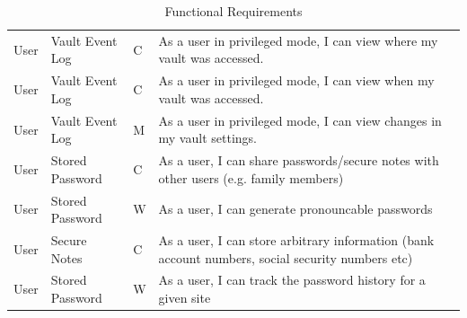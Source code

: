 \documentclass{article}
\begin{document}
\begin{table}[H]
{\begin{tabular}{>{\centering}m{1cm} >{\centering}m{4cm} >{\centering}m{2cm} >{\centering\arraybackslash}m{8cm} }
    User & Vault Event Log & C & As a user in privileged mode, I can view where my vault was accessed. \\
    User & Vault Event Log & C & As a user in privileged mode, I can view when my vault was accessed. \\
    User & Vault Event Log & M & As a user in privileged mode, I can view changes in my vault settings. \\
    User & Stored Password & C & As a user, I can share passwords/secure notes with other users (e.g. family members) \\
    User & Stored Password & W & As a user, I can generate pronouncable passwords \\
    User & Secure Notes & C & As a user, I can store arbitrary information (bank account numbers, social security numbers etc) \\
    User & Stored Password & W & As a user, I can track the password history for a given site \\
    \bottomrule
    \end{tabular}
  }
  \caption{Functional Requirements}
  \label{tab:functional_requirements}
\end{table}
\end{document}
